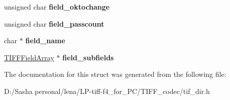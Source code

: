 \begin{DoxyCompactItemize}
\item 
\hypertarget{struct___t_i_f_f_field_a4b973eabd1f78297fe8213684610c524}{}unsigned char {\bfseries field\+\_\+oktochange}\label{struct___t_i_f_f_field_a4b973eabd1f78297fe8213684610c524}

\item 
\hypertarget{struct___t_i_f_f_field_a921d57a57daa0f9f6ccb853e57c651d8}{}unsigned char {\bfseries field\+\_\+passcount}\label{struct___t_i_f_f_field_a921d57a57daa0f9f6ccb853e57c651d8}

\item 
\hypertarget{struct___t_i_f_f_field_acd2269a44a3f004f7932c866d892da9a}{}char $\ast$ {\bfseries field\+\_\+name}\label{struct___t_i_f_f_field_acd2269a44a3f004f7932c866d892da9a}

\item 
\hypertarget{struct___t_i_f_f_field_a7058e3e75dca955e149328e128b4fe9c}{}\hyperlink{struct___t_i_f_f_field_array}{T\+I\+F\+F\+Field\+Array} $\ast$ {\bfseries field\+\_\+subfields}\label{struct___t_i_f_f_field_a7058e3e75dca955e149328e128b4fe9c}

\end{DoxyCompactItemize}


The documentation for this struct was generated from the following file\+:\begin{DoxyCompactItemize}
\item 
D\+:/\+Sasha personal/lena/\+L\+P-\/tiff-\/f4\+\_\+for\+\_\+\+P\+C/\+T\+I\+F\+F\+\_\+codec/tif\+\_\+dir.\+h\end{DoxyCompactItemize}

